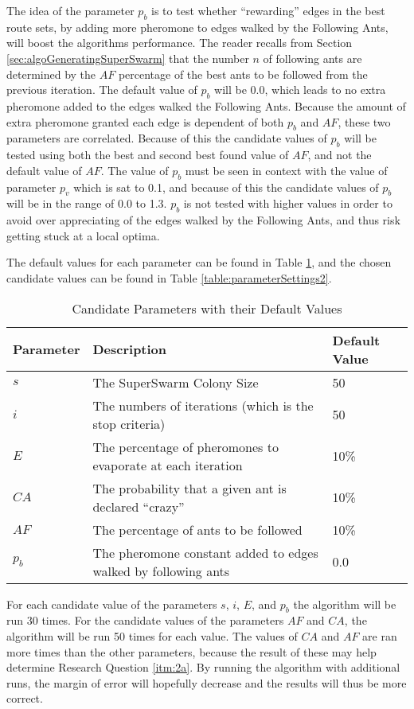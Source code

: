 The idea of the parameter $p_b$ is to test whether ``rewarding'' edges in the best route sets, by adding more pheromone to edges walked by the Following Ants, will boost the algorithms performance. The reader recalls from Section \vref{sec:algoGeneratingSuperSwarm} that the number $n$ of following ants are determined by the $AF$ percentage of the best ants to be followed from the previous iteration. The default value of $p_b$ will be 0.0, which leads to no extra pheromone added to the edges walked the Following Ants. Because the amount of extra pheromone granted each edge is dependent of both $p_b$ and $AF$, these two parameters are correlated. Because of this the candidate values of $p_b$ will be tested using both the best and second best found value of $AF$, and not the default value of $AF$. The value of $p_b$ must be seen in context with the value of parameter $p_v$ which is sat to 0.1, and because of this the candidate values of $p_b$ will be in the range of 0.0 to 1.3. $p_b$ is not tested with higher values in order to avoid over appreciating of the edges walked by the Following Ants, and thus risk getting stuck at a local optima.  

The default values for each parameter can be found in Table \ref{table:parameters}, and the chosen candidate values can be found in Table \vref{table:parameterSettings2}.

\begin{table}[H]
	\small
	\begin{tabular}{|l|l|l|}
    	\hline
    	Parameter & Description & Default Value\\
    	\hline
    	$s$ & The SuperSwarm Colony Size & 50\\
    	$i$ & The numbers of iterations (which is the stop criteria) & 50\\
    	$E$ & The percentage of pheromones to evaporate at each iteration & 10\%\\
    	$CA$ & The probability that a given ant is declared ``crazy'' & 10\%\\
    	$AF$ & The percentage of ants to be followed & 10\%\\
        $p_b$ & The pheromone constant added to edges walked by following ants & 0.0\\
   	    \hline
    \end{tabular}
    \caption {Candidate Parameters with their Default Values}
    \label{table:parameters}
\end{table}

For each candidate value of the parameters $s$, $i$, $E$, and $p_b$ the algorithm will be run 30 times.  For the candidate values of the parameters $AF$ and $CA$, the algorithm will be run 50 times for each value. 
The values of $CA$ and $AF$ are ran more times than the other parameters, because the result of these may help determine Research Question \vref{itm:2a}. By running the algorithm with additional runs, the margin of error will hopefully decrease and the results will thus be more correct.

